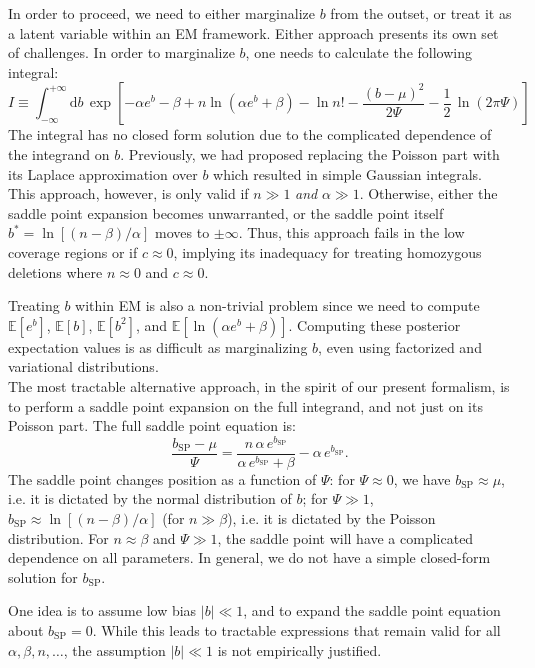 \documentclass[nofootinbib,amssymb,amsmath]{revtex4}
\newcommand{\EE}{\mathbb{E}}
\begin{document}
In order to proceed, we need to either marginalize $b$ from the outset, or treat it as a latent variable within an EM framework. Either approach presents its own set of challenges. In order to marginalize $b$, one needs to calculate the following integral:
\begin{equation}
I \equiv \int_{-\infty}^{+\infty}\mathrm{d}b\,\exp\left[-\alpha e^b -\beta + n \ln(\alpha e^b + \beta) - \ln n! - \frac{(b-\mu)^2}{2\Psi} - \frac{1}{2}\,\ln(2\pi \Psi)\right]
\end{equation}
The integral has no closed form solution due to the complicated dependence of the integrand on $b$. Previously, we had proposed replacing the Poisson part with its Laplace approximation over $b$ which resulted in simple Gaussian integrals. This approach, however, is only valid if $n \gg 1$ {\em and} $\alpha \gg 1$. Otherwise, either the saddle point expansion becomes unwarranted, or the saddle point itself $b^* = \ln[(n-\beta)/\alpha]$ moves to $\pm \infty$. Thus, this approach fails in the low coverage regions or if $c \approx 0$, implying its inadequacy for treating homozygous deletions where $n \approx 0$ and $c \approx 0$.

Treating $b$ within EM is also a non-trivial problem since we need to compute $\EE[e^b]$, $\EE[b]$, $\EE[b^2]$, and $\EE[\ln(\alpha e^b + \beta)]$. Computing these posterior expectation values is as difficult as marginalizing $b$, even using factorized and variational distributions.\\

The most tractable alternative approach, in the spirit of our present formalism, is to perform a saddle point expansion on the full integrand, and not just on its Poisson part. The full saddle point equation is:
\begin{equation}
\frac{b_\mathrm{SP} - \mu}{\Psi} =  \frac{n\,\alpha\,e^{b_\mathrm{SP}}}{\alpha\,e^{b_\mathrm{SP}} + \beta} - \alpha\,e^{b_\mathrm{SP}}.
\end{equation}
The saddle point changes position as a function of $\Psi$: for $\Psi \approx 0$, we have $b_\mathrm{SP} \approx \mu$, i.e. it is dictated by the normal distribution of $b$; for $\Psi \gg 1$, $b_\mathrm{SP} \approx \ln[(n-\beta)/\alpha]$ (for $n \gg \beta$), i.e. it is dictated by the Poisson distribution. For $n \approx \beta$ and $\Psi \gg 1$, the saddle point will have a complicated dependence on all parameters. In general, we do not have a simple closed-form solution for $b_\mathrm{SP}$. 

One idea is to assume low bias $|b| \ll 1$, and to expand the saddle point equation about $b_\mathrm{SP} = 0$. While this leads to tractable expressions that remain valid for all $\alpha, \beta, n, \ldots$, the assumption $|b| \ll 1$ is not empirically justified.   
\end{document}
